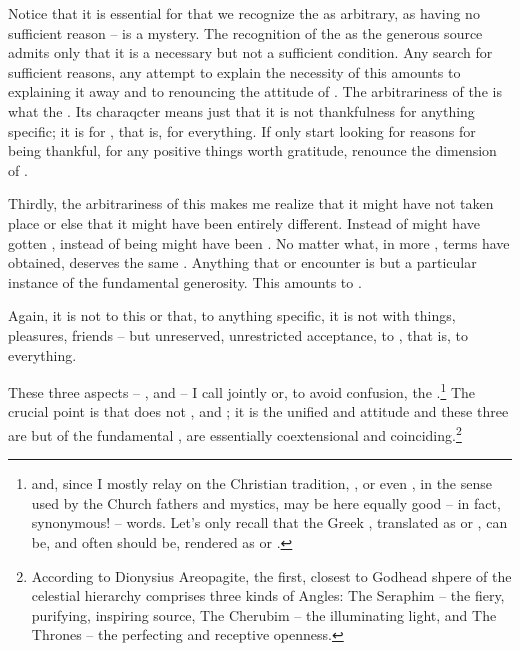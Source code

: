 {Notice that it is essential for  that we recognize
the  as arbitrary, as having no sufficient reason --
 is a mystery.  The recognition of the  as the
generous source admits only that it is a necessary but not a
sufficient condition.  Any search for sufficient reasons, any attempt
to explain the necessity of this  amounts to explaining it
away and to renouncing the attitude of .  The
arbitrariness of the  is what  the . Its  charaqcter means just that it
 is not thankfulness for anything specific; it is
 for , that is, for everything.  If only
 start looking for reasons for being thankful, for any positive
things worth gratitude,  renounce the  dimension of
.

\pa\label{openness} 
Thirdly, the arbitrariness of this  makes me realize that
it might have not taken place or else that it might have been entirely
different.  Instead of   might have gotten ,
instead of being   might have been .  No
matter what, in more ,  terms  have
obtained, deserves the same .  Anything that  or encounter is but a particular instance of the fundamental
generosity.  This amounts to .

Again, it is not  to this or that, to anything specific, 
it is not  with  things,  
pleasures,  friends -- 
but unreserved, unrestricted acceptance,  to
, that is, to everything.

\pa These three aspects -- ,  and
 -- I call jointly 
or, to avoid confusion, the .\footnote{
and, since I mostly relay on the Christian tradition, , or
even , in the sense used by the Church fathers and
mystics, may be here equally good -- in fact, synonymous!  -- words. 
Let's only recall that the Greek , translated as  
or , 
can be, and often should be, rendered as  or .}  
The crucial point is that  does not  
,  and ; it is the unified 
and  attitude and these three 
are but  of the fundamental \yes, are
essentially coextensional and coinciding.\footnote{According to
Dionysius Areopagite, the first, closest to Godhead shpere of the
celestial hierarchy comprises three kinds of Angles: The Seraphim --
the fiery, purifying, inspiring source, The Cherubim -- the
illuminating light, and The Thrones -- the perfecting and receptive
openness.} 

}
